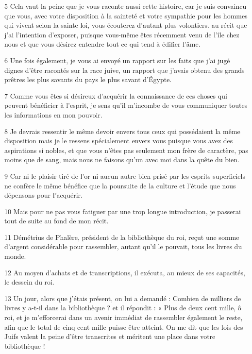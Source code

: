 \par 5 Cela vaut la peine que je vous raconte aussi cette histoire, car je suis convaincu que vous, avec votre disposition à la sainteté et votre sympathie pour les hommes qui vivent selon la sainte loi, vous écouterez d'autant plus volontiers. au récit que j'ai l'intention d'exposer, puisque vous-même êtes récemment venu de l'île chez nous et que vous désirez entendre tout ce qui tend à édifier l'âme.

\par 6 Une fois également, je vous ai envoyé un rapport sur les faits que j'ai jugé dignes d'être racontés sur la race juive, un rapport que j'avais obtenu des grands prêtres les plus savants du pays le plus savant d'Égypte.

\par 7 Comme vous êtes si désireux d'acquérir la connaissance de ces choses qui peuvent bénéficier à l'esprit, je sens qu'il m'incombe de vous communiquer toutes les informations en mon pouvoir.

\par 8 Je devrais ressentir le même devoir envers tous ceux qui possédaient la même disposition mais je le ressens spécialement envers vous puisque vous avez des aspirations si nobles, et que vous n'êtes pas seulement mon frère de caractère, pas moins que de sang, mais nous ne faisons qu'un avec moi dans la quête du bien.

\par 9 Car ni le plaisir tiré de l'or ni aucun autre bien prisé par les esprits superficiels ne confère le même bénéfice que la poursuite de la culture et l'étude que nous dépensons pour l'acquérir.

\par 10 Mais pour ne pas vous fatiguer par une trop longue introduction, je passerai tout de suite au fond de mon récit.

\par 11 Démétrius de Phalère, président de la bibliothèque du roi, reçut une somme d'argent considérable pour rassembler, autant qu'il le pouvait, tous les livres du monde.

\par 12 Au moyen d'achats et de transcriptions, il exécuta, au mieux de ses capacités, le dessein du roi.

\par 13 Un jour, alors que j'étais présent, on lui a demandé : Combien de milliers de livres y a-t-il dans la bibliothèque ? et il répondit : « Plus de deux cent mille, ô roi, et je m'efforcerai dans un avenir immédiat de rassembler également le reste, afin que le total de cinq cent mille puisse être atteint. On me dit que les lois des Juifs valent la peine d'être transcrites et méritent une place dans votre bibliothèque !

